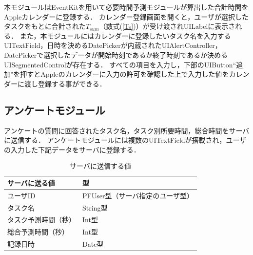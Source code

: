 本モジュールはEventKitを用いて必要時間予測モジュールが算出した合計時間をAppleカレンダーに登録する．
カレンダー登録画面を開くと，ユーザが選択したタスクをもとに合計された$T_{sum}$（数式(\ref{Ts})）が受け渡されUILabelに表示される．
また，本モジュールにはカレンダーに登録したいタスク名を入力するUITextField，日時を決めるDatePickerが内蔵されたUIAlertController，DatePickerで選択したデータが開始時刻であるか終了時刻であるか決めるUISegmentedControlが存在する．
すべての項目を入力し，下部のUIButton``追加"を押すとAppleのカレンダーに入力の許可を確認した上で入力した値をカレンダーに渡し登録する事ができる．

\subsection{アンケートモジュール}
アンケートの質問に回答されたタスク名，タスク別所要時間，総合時間をサーバに送信する．
アンケートモジュールには複数のUITextFieldが搭載され，ユーザの入力した下記データをサーバに登録する．
\begin{table}[htb]
\begin{center}
  \caption{サーバに送信する値}
  \begin{tabular}{|l|l|} \hline
    サーバに送る値 & 型 \\ \hline
    ユーザID & PFUser型（サーバ指定のユーザ型） \\
    タスク名 & String型 \\
    タスク予測時間（秒） & Int型 \\
    総合予測時間（秒） & Int型 \\
    記録日時 & Date型 \\
	\hline
  \end{tabular}
  \label{tb:serverdata2}
\end{center}
\end{table}

